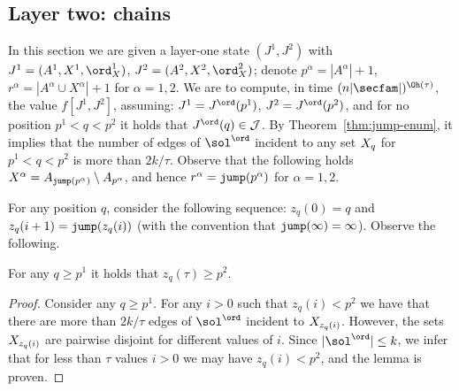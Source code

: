 \subsection{Layer two: chains}

In this section we are given a layer-one state $(J^1,J^2)$ with $J^1 = (A^1,X^1,\ord_X^1)$, $J^2 = (A^2,X^2,\ord_X^2)$;
denote $p^\alpha = |A^\alpha| + 1$, $r^\alpha = |A^\alpha \cup X^\alpha|+1$ for $\alpha = 1,2$.
We are to compute, in time $(n|\secfam|)^{\Oh(\tau)}$, the value $f[J^1,J^2]$, assuming: $J^1 = J^\ord(p^1)$, $J^2 = J^\ord(p^2)$, and
for no position $p^1 < q < p^2$ it holds that $J^\ord(q) \in \jumpfam$. By Theorem~\ref{thm:jump-enum}, it implies that the number of edges of $\sol^\ord$
incident to any set $X_{q}$ for $p^1 < q < p^2$ is more than $2k/\tau$. Observe that the following holds  $X^\alpha=A_{\mathtt{jump}(p^\alpha)} \setminus A_{p^\alpha}$, and hence $r^\alpha=\mathtt{jump}(p^\alpha)$ for $\alpha=1,2$. 

For any position $q$, consider the following sequence: $z_q(0) = q$ and $z_q(i+1) = \mathtt{jump}(z_q(i))$ (with the convention that $\mathtt{jump}(\infty) = \infty$).
Observe the following.
\begin{lemma}\label{lem:short-z}
For any $q \geq p^1$ it holds that $z_q(\tau) \geq p^2$.
\end{lemma}
\begin{proof}
Consider any $q \geq p^1$. For any $i > 0$ such that $z_q(i) < p^2$ we have
that there are more than $2k/\tau$ edges of $\sol^\ord$ incident to $X_{z_q(i)}$.
However, the sets $X_{z_q(i)}$ are pairwise disjoint for different values of $i$.
Since $|\sol^\ord|\leq k$, we infer that for less than $\tau$ values $i > 0$ we may have $z_q(i) < p^2$, and the lemma is proven.
\end{proof}

